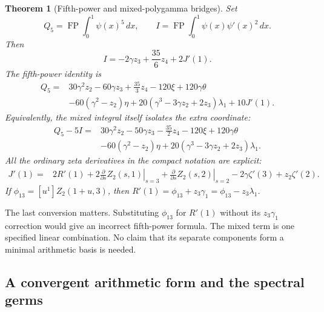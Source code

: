 \documentclass[11pt,a4paper]{article}
\numberwithin{equation}{section}
\newtheorem{theorem}{Theorem}[section]
\theoremstyle{definition}
\begin{document}
\begin{theorem}[Fifth-power and mixed-polygamma bridges]
\label{q5:main}
Set
\[
 Q_5=\operatorname{FP}\int_0^1\psi(x)^5\,dx,
 \qquad
 I=\operatorname{FP}\int_0^1\psi(x)\psi'(x)^2\,dx.
\]
Then
\begin{equation}\label{q5:Ibridge}
 \boxed{\displaystyle
 I=-2\gamma z_3+\frac{35}{6}z_4+2J'(1).}
\end{equation}
The fifth-power identity is
\begin{equation}\label{q5:bridge}
 \boxed{\begin{aligned}
 Q_5={}&30\gamma^2z_2-60\gamma z_3+\frac{35}{3}z_4
       -120\xi+120\gamma\theta\\
 &-60(\gamma^2-z_2)\eta
       +20(\gamma^3-3\gamma z_2+2z_3)\lambda_1
       +10J'(1).
 \end{aligned}}
\end{equation}
Equivalently, the mixed integral itself isolates the extra coordinate:
\begin{equation}\label{q5:QminusI}
 \boxed{\begin{aligned}
 Q_5-5I={}&30\gamma^2z_2-50\gamma z_3-\frac{35}{2}z_4
       -120\xi+120\gamma\theta\\
 &-60(\gamma^2-z_2)\eta
       +20(\gamma^3-3\gamma z_2+2z_3)\lambda_1.
 \end{aligned}}
\end{equation}
All the ordinary zeta derivatives in the compact notation are explicit:
\begin{align}\label{q5:Jexpanded}
 J'(1)={}&2R'(1)
       +2\left.\frac{\partial}{\partial s}Z_2(s,1)\right|_{s=3}
       +\left.\frac{\partial}{\partial s}Z_2(s,2)\right|_{s=2}
       -2\gamma\zeta'(3)+z_2\zeta'(2).
\end{align}
If $\phi_{13}=[u^1]Z_2(1+u,3)$, then
$R'(1)=\phi_{13}+z_3\gamma_1=\phi_{13}-z_3\lambda_1$.
\end{theorem}

The last conversion matters.  Substituting $\phi_{13}$ for $R'(1)$
without its $z_3\gamma_1$ correction would give an incorrect fifth-power
formula.  The mixed term is one specified linear combination.  No claim
that its separate components form a minimal arithmetic basis is needed.

\subsection{A convergent arithmetic form and the spectral germs}
\end{document}
